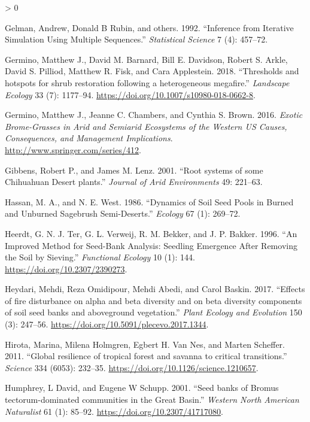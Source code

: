 \documentclass[
  12pt,
]{article}
\newlength{\cslhangindent}
\newenvironment{CSLReferences}[2] %
 {%
  \setlength{\parindent}{0pt}
  \ifodd #1 \everypar{\setlength{\hangindent}{\cslhangindent}}\ignorespaces\fi
  \ifnum #2 > 0
  \setlength{\parskip}{#2\baselineskip}
  \fi
 }%
 {}
\begin{document}
\begin{CSLReferences}{1}{0}
\leavevmode\hypertarget{ref-Gelman1992}{}%
Gelman, Andrew, Donald B Rubin, and others. 1992. {``Inference from
Iterative Simulation Using Multiple Sequences.''} \emph{Statistical
Science} 7 (4): 457--72.

\leavevmode\hypertarget{ref-Germino2018}{}%
Germino, Matthew J., David M. Barnard, Bill E. Davidson, Robert S.
Arkle, David S. Pilliod, Matthew R. Fisk, and Cara Applestein. 2018.
{``{Thresholds and hotspots for shrub restoration following a
heterogeneous megafire}.''} \emph{Landscape Ecology} 33 (7): 1177--94.
\url{https://doi.org/10.1007/s10980-018-0662-8}.

\leavevmode\hypertarget{ref-Germino2016}{}%
Germino, Matthew J., Jeanne C. Chambers, and Cynthia S. Brown. 2016.
\emph{{Exotic Brome-Grasses in Arid and Semiarid Ecosystems of the
Western US Causes, Consequences, and Management Implications}}.
\url{http://www.springer.com/series/412}.

\leavevmode\hypertarget{ref-Gibbens2001}{}%
Gibbens, Robert P., and James M. Lenz. 2001. {``{Root systems of some
Chihuahuan Desert plants}.''} \emph{Journal of Arid Environments} 49:
221--63.

\leavevmode\hypertarget{ref-Hassan1986}{}%
Hassan, M. A., and N. E. West. 1986. {``{Dynamics of Soil Seed Pools in
Burned and Unburned Sagebrush Semi-Deserts}.''} \emph{Ecology} 67 (1):
269--72.

\leavevmode\hypertarget{ref-Heerdt1996}{}%
Heerdt, G. N. J. Ter, G. L. Verweij, R. M. Bekker, and J. P. Bakker.
1996. {``{An Improved Method for Seed-Bank Analysis: Seedling Emergence
After Removing the Soil by Sieving}.''} \emph{Functional Ecology} 10
(1): 144. \url{https://doi.org/10.2307/2390273}.

\leavevmode\hypertarget{ref-Heydari2017}{}%
Heydari, Mehdi, Reza Omidipour, Mehdi Abedi, and Carol Baskin. 2017.
{``{Effects of fire disturbance on alpha and beta diversity and on beta
diversity components of soil seed banks and aboveground vegetation}.''}
\emph{Plant Ecology and Evolution} 150 (3): 247--56.
\url{https://doi.org/10.5091/plecevo.2017.1344}.

\leavevmode\hypertarget{ref-Hirota2011}{}%
Hirota, Marina, Milena Holmgren, Egbert H. Van Nes, and Marten Scheffer.
2011. {``{Global resilience of tropical forest and savanna to critical
transitions}.''} \emph{Science} 334 (6053): 232--35.
\url{https://doi.org/10.1126/science.1210657}.

\leavevmode\hypertarget{ref-Humphrey2001}{}%
Humphrey, L David, and Eugene W Schupp. 2001. {``{Seed banks of Bromus
tectorum-dominated communities in the Great Basin}.''} \emph{Western
North American Naturalist} 61 (1): 85--92.
\url{https://doi.org/10.2307/41717080}.


\end{CSLReferences}
\end{document}
